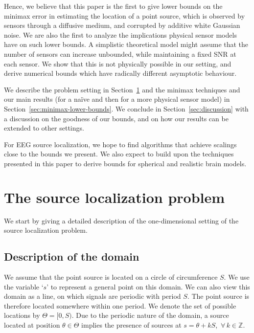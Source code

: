 \documentclass[conference]{IEEEtran}
\begin{document}
Hence, we believe that this paper is the first to give lower bounds on the
minimax error in estimating the location of a point source, which is observed
by sensors through a diffusive medium, and corrupted by additive white Gaussian
noise. We are also the first to analyze the implications physical sensor models
have on such lower bounds. A simplistic theoretical model might assume that the
number of sensors can increase unbounded, while maintaining a fixed SNR at each
sensor. We show that this is not physically possible in our setting, and derive
numerical bounds which have radically different asymptotic behaviour.

We describe the problem setting in Section~\ref{sec:source-localization} and
the minimax techniques and our main results (for a na\"ive and then for a more
physical sensor model) in Section~\ref{sec:minimax-lower-bounds}. We conclude
in Section~\ref{sec:discussion} with a discussion on the goodness of our
bounds, and on how our results can be extended to other settings.

For EEG source localization, we hope to find algorithms that achieve scalings
close to the bounds we present.  We also expect to build upon the techniques
presented in this paper to derive bounds for spherical and realistic brain
models.

\section{The source localization problem}
\label{sec:source-localization}

We start by giving a detailed description of the one-dimensional setting of the
source localization problem.

\subsection{Description of the domain}

We assume that the point source is located on a circle of circumference $S$. We
use the variable `$s$' to represent a general point on this domain. We can also
view this domain as a line, on which signals are periodic with period $S$.  The
point source is therefore located somewhere within one period. We denote the
set of possible locations by $\Theta = [0, S)$. Due to the periodic nature of
the domain, a source located at position $\theta \in \Theta$ implies the
presence of sources at $s = \theta + kS$,~$\forall \, k \in \mathbb Z$.
\end{document}
